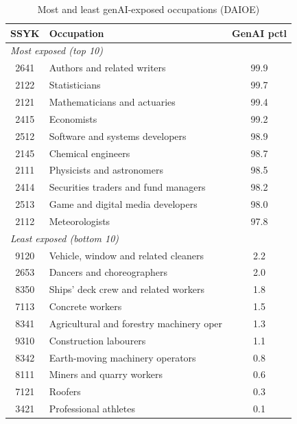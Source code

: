 \begin{table}[htbp]
\centering
\caption{Most and least genAI-exposed occupations (DAIOE)}
\label{tab:topbottom}
\begin{tabular}{clc}
\hline\hline
SSYK & Occupation & GenAI pctl \\
\hline
\multicolumn{3}{l}{\textit{Most exposed (top 10)}} \\
2641 & Authors and related writers & 99.9 \\
2122 & Statisticians & 99.7 \\
2121 & Mathematicians and actuaries & 99.4 \\
2415 & Economists & 99.2 \\
2512 & Software and systems developers & 98.9 \\
2145 & Chemical engineers & 98.7 \\
2111 & Physicists and astronomers & 98.5 \\
2414 & Securities traders and fund managers & 98.2 \\
2513 & Game and digital media developers & 98.0 \\
2112 & Meteorologists & 97.8 \\
\hline
\multicolumn{3}{l}{\textit{Least exposed (bottom 10)}} \\
9120 & Vehicle, window and related cleaners & 2.2 \\
2653 & Dancers and choreographers & 2.0 \\
8350 & Ships' deck crew and related workers & 1.8 \\
7113 & Concrete workers & 1.5 \\
8341 & Agricultural and forestry machinery oper & 1.3 \\
9310 & Construction labourers & 1.1 \\
8342 & Earth-moving machinery operators & 0.8 \\
8111 & Miners and quarry workers & 0.6 \\
7121 & Roofers & 0.3 \\
3421 & Professional athletes & 0.1 \\
\hline\hline
\end{tabular}
\end{table}